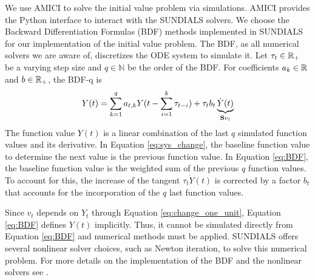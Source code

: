 We use AMICI \citep{Frohlich.2021} to solve the initial value problem via simulations. AMICI provides the Python interface to interact with the SUNDIALS \citep{Hindmarsh.2005} solvers. We choose the Backward Differentiation Formulas (BDF) methods implemented in SUNDIALS for our implementation  of the initial value problem. The BDF, as all numerical solvers we are aware of, discretizes the ODE system to simulate it. Let $\tau_t \in \mathbb{R}_+$ be a varying step size and $q \in \mathbb{N}$ be the order of the BDF. For coefficients $a_k\in \mathbb{R}$ and $b \in \mathbb{R}_+$, the BDF-q is  
\begin{align}
\label{eq:BDF}
Y(t) = \sum_{k=1}^q a_{t,k} Y(t - \sum_{i=1}^k \tau_{t-i} ) + \tau_t b_t \underbrace{\dot{Y}(t)}_{\mathbf{S} v_t}
\end{align}
The function value $Y(t)$ is a linear combination of the last $q$ simulated function values and its derivative. In Equation \eqref{eq:sys_change}, the baseline function value to determine the next value is the previous function value. In Equation \eqref{eq:BDF}, the baseline function value is the weighted sum of the previous $q$ function values. To account for this, the increase of the tangent $\tau_t \dot{Y}(t)$ is corrected by a factor $b_t$ that accounts for the incorporation of the $q$ last function values.

Since $v_t$ depends on $Y_t$ through Equation \eqref{eq:change_one_unit}, Equation \eqref{eq:BDF} defines $Y(t)$ implicitly. Thus, it cannot be simulated directly from Equation \eqref{eq:BDF} and numerical methods must be applied. SUNDIALS offers several nonlinear solver choices, such as Newton iteration, to solve this numerical problem. For more details on the implementation of the BDF and the nonlinear solvers see \cite{Hindmarsh.2019}.
 
